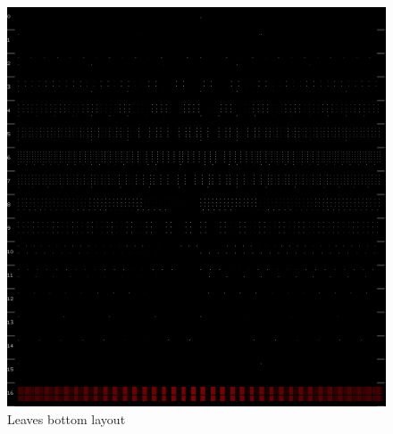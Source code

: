 \begin{figure}[h!]
\centering
\includegraphics[scale=0.3]{pictures/go_leaves_bottom_layout.png}
\caption{Leaves bottom layout}
\label{fig:go_leaves_bottom_layout}
\end{figure}